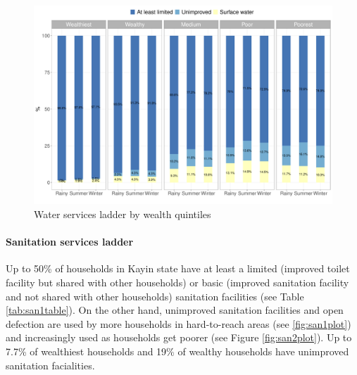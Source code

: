 \documentclass[12pt,a4paper]{article}
\let\oldparagraph\paragraph
\renewcommand{\paragraph}[1]{\oldparagraph{#1}\mbox{}}
\begin{document}
\begin{figure}[H]

{\centering \includegraphics{kayinReport_files/figure-latex/wash2plot-1} 

}

\caption{Water services ladder by wealth quintiles}\label{fig:wash2plot}
\end{figure}

\hypertarget{sanitation-services-ladder}{%
\paragraph{Sanitation services ladder}\label{sanitation-services-ladder}}

Up to 50\% of households in Kayin state have at least a limited (improved toilet facility but shared with other households) or basic (improved sanitation facility and not shared with other households) sanitation facilities (see Table \ref{tab:san1table}). On the other hand, unimproved sanitation facilities and open defection are used by more households in hard-to-reach areas (see \ref{fig:san1plot}) and increasingly used as households get poorer (see Figure \ref{fig:san2plot}). Up to 7.7\% of wealthiest households and 19\% of wealthy households have unimproved sanitation facialities.
\end{document}
